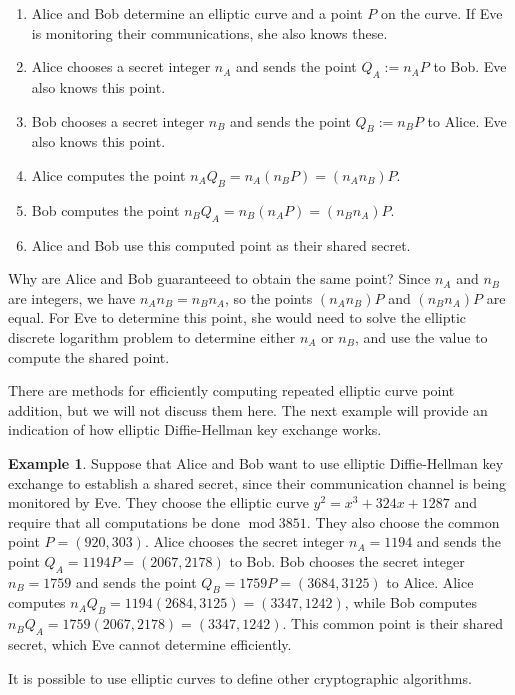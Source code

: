 \documentclass{book}
\theoremstyle{plain}
\theoremstyle{definition}
\newtheorem{example}[theorem]{Example}
\renewcommand{\mod}{\operatorname{mod}}
\renewcommand{\mod}{\operatorname{mod}}
\begin{document}
\begin{enumerate}
\item Alice and Bob determine an elliptic curve and a point $P$ on the curve. If Eve is monitoring their communications, she also knows these.
\item Alice chooses a secret integer $n_A$ and sends the point $Q_A := n_AP$ to Bob. Eve also knows this point.
\item Bob chooses a secret integer $n_B$ and sends the point $Q_B := n_BP$ to Alice. Eve also knows this point.
\item Alice computes the point $n_AQ_B = n_A(n_BP) = (n_An_B)P$.
\item Bob computes the point $n_BQ_A = n_B(n_AP) = (n_Bn_A)P$.
\item Alice and Bob use this computed point as their shared secret.
\end{enumerate}

Why are Alice and Bob guaranteeed to obtain the same point? Since $n_A$ and $n_B$ are integers, we have $n_An_B = n_Bn_A$, so the points $(n_An_B)P$ and $(n_Bn_A)P$ are equal. For Eve to determine this point, she would need to solve the elliptic discrete logarithm problem to determine either $n_A$ or $n_B$, and use the value to compute the shared point.

There are methods for efficiently computing repeated elliptic curve point addition, but we will not discuss them here. The next example will provide an indication of how elliptic Diffie-Hellman key exchange works.

\begin{example}
Suppose that Alice and Bob want to use elliptic Diffie-Hellman key exchange to establish a shared secret, since their communication channel is being monitored by Eve. They choose the elliptic curve $y^2 = x^3 + 324x + 1287$ and require that all computations be done $\mod 3851$. They also choose the common point $P = (920,303)$. Alice chooses the secret integer $n_A = 1194$ and sends the point $Q_A = 1194P = (2067,2178)$ to Bob. Bob chooses the secret integer $n_B = 1759$ and sends the point $Q_B = 1759P = (3684,3125)$ to Alice. Alice computes $n_AQ_B = 1194(2684,3125) = (3347,1242)$, while Bob computes $n_BQ_A = 1759(2067,2178) = (3347,1242)$. This common point is their shared secret, which Eve cannot determine efficiently.
\end{example}

It is possible to use elliptic curves to define other cryptographic algorithms.
\end{document}
